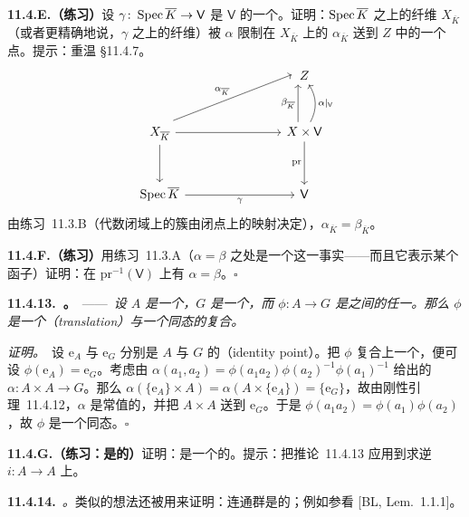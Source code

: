 \textbf{11.4.E.（练习）}\quad 设 $\gamma\colon\operatorname{Spec}\overline{K}\to\mathsf{V}$ 是 $\mathsf{V}$ 的一个\trGeometricPoint。证明：$\operatorname{Spec}\overline{K}$ 之上的纤维 $X_{\overline{K}}$（或者更精确地说，$\gamma$ 之上的纤维）被 $\alpha$ 限制在 $X_{\overline{K}}$ 上的 $\alpha_{\overline{K}}$ 送到 $Z$ 中的一个点。提示：重温 \S11.4.7。
\[
\begin{tikzcd}[row sep=3em, column sep=3.8em]
& & Z \\
X_{\overline{K}} \ar[rr] \ar[d] \ar[urr, "\alpha_{\overline{K}}", shift left=0.5em] & & X\times\mathsf{V} \ar[u, "\beta_{\overline{K}}", shift left=0.5em] \ar[u, bend right=30, "\alpha|_{\mathsf{V}}"'] \ar[d, "\mathrm{pr}"'] \\
\Spec\overline{K} \ar[rr, "\gamma"'] & & \mathsf{V}
\end{tikzcd}
\]
由\mbox{练习~11.3.B}（代数闭域上的簇由闭点上的映射决定），$\alpha_{\overline{K}}=\beta_{\overline{K}}$。

\textbf{11.4.F.（练习）}\quad 用\mbox{练习~11.3.A}（$\alpha=\beta$ 之处是一个\trClosedSubscheme{}这一事实——而且它表示某个函子）证明：在 $\mathrm{pr}^{-1}(\mathsf{V})$ 上有 $\alpha=\beta$。\hfill$\square$

\textbf{11.4.13.\ \trhCorollary{}。}\ ——\ \emph{设 $A$ 是一个\trAbelian\trVariety，$G$ 是一个\trGroup\trVariety，而 $\phi\colon A\to G$ 是\trVariety{}之间的任一\trMorphism。那么 $\phi$ 是一个\trTranslation{}（translation）与一个同态的复合。}

\emph{证明。}\ 设 $\mathrm{e}_A$ 与 $\mathrm{e}_G$ 分别是 $A$ 与 $G$ 的\trIdentityPoint{}（identity point）。把 $\phi$ 复合上一个\trTranslation{}，便可设 $\phi(\mathrm{e}_A)=\mathrm{e}_G$。考虑由 $\alpha(a_1,a_2)=\phi(a_1a_2)\phi(a_2)^{-1}\phi(a_1)^{-1}$ 给出的\trMorphism{} $\alpha\colon A\times A\to G$。那么 $\alpha(\{\mathrm{e}_A\}\times A)=\alpha(A\times\{\mathrm{e}_A\})=\{\mathrm{e}_G\}$，故由刚性引理~11.4.12，$\alpha$ 是常值的，并把 $A\times A$ 送到 $\mathrm{e}_G$。于是 $\phi(a_1a_2)=\phi(a_1)\phi(a_2)$，故 $\phi$ 是一个同态。\hfill$\square$

\textbf{11.4.G.（练习：\trAbelianVariety{}是\trAbelian{}的）}\quad 证明：\trAbelianVariety{}是一个\trAbelian{}的\trGroupVariety{}。提示：把推论~11.4.13 应用到求逆\trMorphism{} $i\colon A\to A$ 上。

\textbf{11.4.14.}\ \emph{\trhRemark{}。}\quad 类似的想法还被用来证明：连通\trCompact{}\trComplex{}\trLie{}群是\trAbelian{}的；例如参看 [BL, Lem.~1.1.1]。
